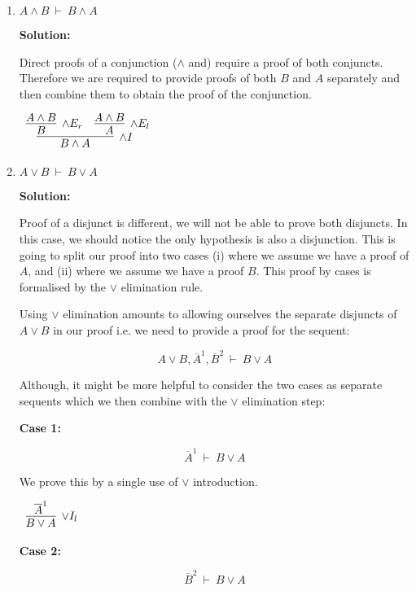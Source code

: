 \documentclass[11pt]{report}
\newcommand{\temp}[2]{{\overline{#2}}^{#1}}
\begin{document}
\begin{enumerate}
\begin{enumerate}
		\item $A \land B \ \vdash \ B \land A$
		

		\textbf{Solution:}

		Direct proofs of a conjunction ($\land$ and) require a proof of both conjuncts. Therefore we are required to provide proofs of both $B$ and $A$ separately and then combine them to obtain the proof of the conjunction. 

		\begin{center}
			$\begin{array}{c}
				\infer[\land I]{B \land A}
					{\infer[\land E_{r}]{B}
						{A \land B}
					&
					\infer[\land E_{l}]{A}
						{A \land B}}
			\end{array}$
		\end{center}
			
		\newpage
		\item $A \lor B \ \vdash \ B \lor A$
		
		\textbf{Solution:}

		Proof of a disjunct is different, we will not be able to prove both disjuncts. In this case, we should notice the only hypothesis is also a disjunction. This is going to split our proof into two cases (i) where we assume we have a proof of $A$, and (ii) where we assume we have a proof $B$. This proof by cases is formalised by the $\lor$ elimination rule. 

		Using $\lor$ elimination amounts to allowing ourselves the separate disjuncts of $A \lor B$ in our proof i.e. we need to provide a proof for the sequent: 

		$$A \lor B, \temp{1}{A}, \temp{2}{B} \ \vdash \ B \lor A $$

		Although, it might be more helpful to consider the two cases as separate sequents which we then combine with the $\lor$ elimination step: 

		\textbf{Case 1:}

		$$\temp{1}{A} \ \vdash \ B \lor A $$

		We prove this by a single use of $\lor$ introduction. 

		\begin{center}
			$\begin{array}{c}
				\infer[\lor I_{l}]{B \lor A}
					{\temp{1}{A}}
			\end{array}$
		\end{center}

		\textbf{Case 2:}

		$$\temp{2}{B} \ \vdash \ B \lor A $$
		

\end{enumerate}
\end{enumerate}
\end{document}
